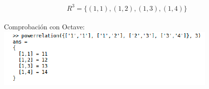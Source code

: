 \documentclass[11pt]{article}
\begin{document}
\begin{equation}
	R^3 = \{(1,1),(1,2),(1,3),(1,4)\}
\end{equation}
\\
Comprobación con Octave:\\

\includegraphics[scale=0.80]{ComprobacionOctave.PNG}
\end{document}
